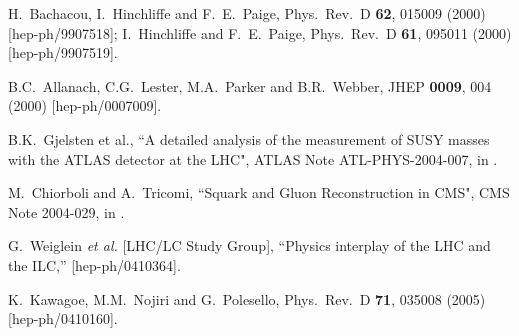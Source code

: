 \documentclass[12pt]{article}
\begin{document}
\begin{thebibliography}{999}
H.~Bachacou, I.~Hinchliffe and F.~E.~Paige,
  Phys.\ Rev.\ D {\bf 62}, 015009 (2000)
  [hep-ph/9907518];
I.~Hinchliffe and F.~E.~Paige,
  Phys.\ Rev.\ D {\bf 61}, 095011 (2000)
  [hep-ph/9907519].
  
B.C.~Allanach, C.G.~Lester, M.A.~Parker and B.R.~Webber,
  JHEP {\bf 0009}, 004 (2000)
  [hep-ph/0007009].

B.K.~Gjelsten et al., ``A detailed analysis of the measurement of SUSY 
masses with the ATLAS detector at the LHC", ATLAS Note ATL-PHYS-2004-007, 
in \cite{LHCILCstudy}.

M.~Chiorboli and A.~Tricomi, ``Squark and Gluon Reconstruction in CMS",
CMS Note 2004-029, in \cite{LHCILCstudy}.

G.~Weiglein {\it et al.}  [LHC/LC Study Group],
  ``Physics interplay of the LHC and the ILC,''
  [hep-ph/0410364].

K.~Kawagoe, M.M.~Nojiri and G.~Polesello,
  Phys.\ Rev.\ D {\bf 71}, 035008 (2005)
  [hep-ph/0410160].






\end{thebibliography}
\end{document}
